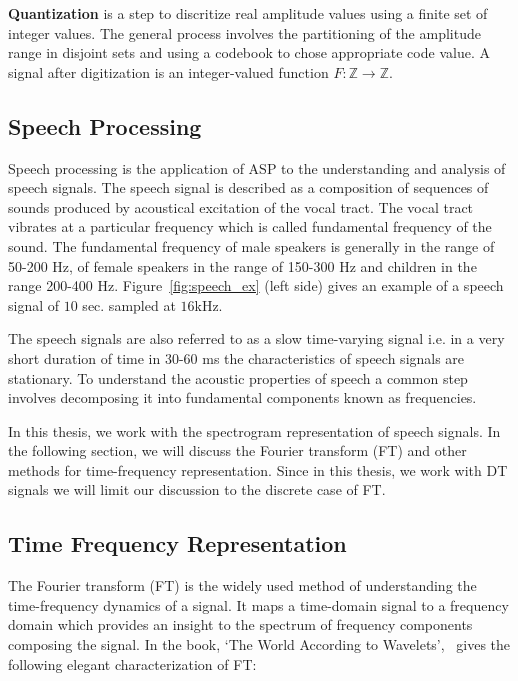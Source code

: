 \textbf{Quantization} is a step to discritize real amplitude values using a finite set of integer values. The general process involves the partitioning of the amplitude range in disjoint sets and using a codebook to chose appropriate code value. A signal after digitization is an integer-valued function $F:\mathbb{Z}\rightarrow\mathbb{Z}$. 

\subsection{Speech Processing}
Speech processing is the application of ASP to the understanding and analysis of speech signals. 
The speech signal is described as a composition of sequences of sounds produced by acoustical excitation of the vocal tract. The vocal tract vibrates at a particular frequency which is called fundamental frequency of the sound. The fundamental frequency of male speakers is generally in the range of 50-200 Hz, of female speakers in the range of 150-300 Hz and children in the range 200-400 Hz.  Figure~\ref{fig:speech_ex} (left side) gives an example of a speech signal of $10$ sec. sampled at $16$kHz. 

The speech signals are also referred to as a slow time-varying signal i.e. in a very short duration of time in 30-60 ms the characteristics of speech signals are stationary. To understand the acoustic properties of speech a common step involves decomposing it into fundamental components known as frequencies. 

In this thesis, we work with the spectrogram representation of speech signals. In the following section, we will discuss the Fourier transform (FT) and other methods for time-frequency representation. Since in this thesis, we work with DT signals we will limit our discussion to the discrete case of FT.

\subsection{Time Frequency Representation}
\label{subsec:timefreq_rep}
The Fourier transform (FT) is the widely used method of understanding the time-frequency dynamics of a signal. It maps a time-domain signal to a frequency domain which provides an insight to the spectrum of frequency components composing the signal. In the book, `The World According to Wavelets',~\citet{hubbard1998world} gives the following elegant characterization of FT:

